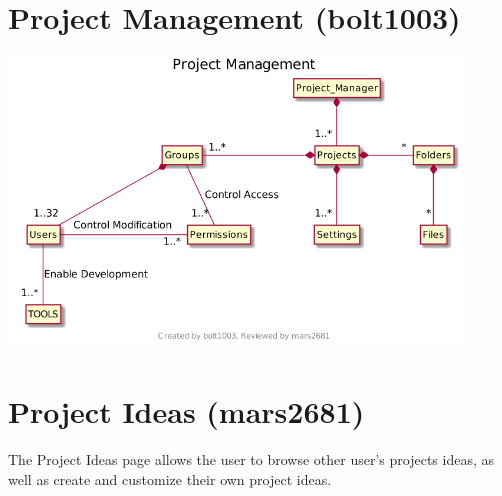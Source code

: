 \documentclass[11pt]{report}
\begin{document}
\section{Project Management (bolt1003)}
    \begin{minipage}{0.9\textwidth}
        \begin{center}
        \includegraphics[width=0.9\textwidth]{diagrams/project-management-bolt1003}
        \end{center}
    \end{minipage}


\section{Project Ideas (mars2681)}
    The Project Ideas page allows the user to browse other user's projects ideas, as well as create and customize their own project ideas.
\end{document}
